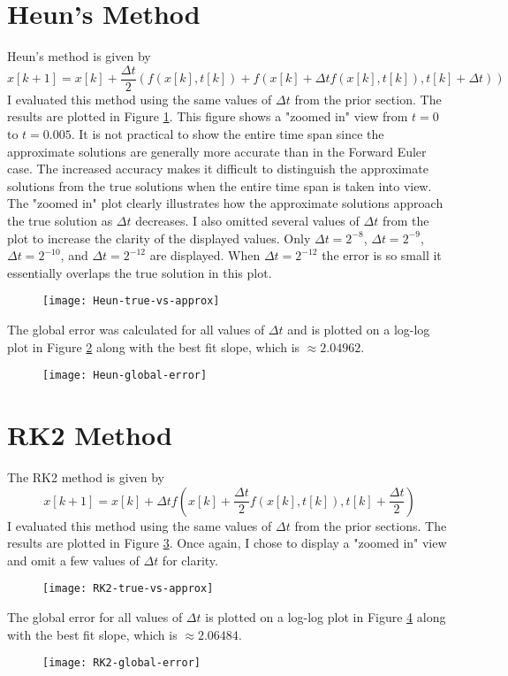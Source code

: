 \documentclass{article}
\begin{document}
\section{Heun's Method}
Heun's method is given by
\begin{equation} \label{eq:5}
    x[k+1] = x[k] + \frac{\Delta t}{2}(f(x[k], t[k]) + f(x[k] + {\Delta t}f(x[k], t[k]), t[k] + \Delta t))
\end{equation}
I evaluated this method using the same values of $\Delta t$ from the prior section.  The results are plotted in Figure \ref{fig:heun-approximations}.  This figure shows a "zoomed in" view from $t = 0$ to $t = 0.005$. It is not practical to show the entire time span since the approximate solutions are generally more accurate than in the Forward Euler case.  The increased accuracy makes it difficult to distinguish the approximate solutions from the true solutions when the entire time span is taken into view.  The "zoomed in" plot clearly illustrates how the approximate solutions approach the true solution as $\Delta t$ decreases.  I also omitted several values of $\Delta t$ from the plot to increase the clarity of the displayed values.  Only $\Delta t = 2^{-8}$, $\Delta t = 2^{-9}$, $\Delta t = 2^{-10}$, and $\Delta t = 2^{-12}$ are displayed.  When $\Delta t = 2^{-12}$ the error is so small it essentially overlaps the true solution in this plot.
\begin{figure}[H]
    \centering
    \texttt{[image: Heun-true-vs-approx]}
    \caption{}
    \label{fig:heun-approximations}
\end{figure}
The global error was calculated for all values of $\Delta t$ and is plotted on a log-log plot in Figure \ref{fig:heun-global-error} along with the best fit slope, which is $\approx 2.04962$.
\begin{figure}[H]
    \centering
    \texttt{[image: Heun-global-error]}
    \caption{}
    \label{fig:heun-global-error}
\end{figure}
\section{RK2 Method}
The RK2 method is given by
\begin{equation} \label{eq:6}
    x[k + 1] = x[k] + {\Delta t}f(x[k] + \frac{\Delta t}{2}f(x[k], t[k]), t[k] + \frac{\Delta t}{2})
\end{equation}
I evaluated this method using the same values of $\Delta t$ from the prior sections.  The results are plotted in Figure \ref{fig:rk2-approximations}.  Once again, I chose to display a "zoomed in" view and omit a few values of $\Delta t$ for clarity.
\begin{figure}[H]
    \centering
    \texttt{[image: RK2-true-vs-approx]}
    \caption{}
    \label{fig:rk2-approximations}
\end{figure}
The global error for all values of $\Delta t$ is plotted on a log-log plot in Figure \ref{fig:rk2-global-error} along with the best fit slope, which is $\approx 2.06484$.
\begin{figure}[H]
    \centering
    \texttt{[image: RK2-global-error]}
    \caption{}
    \label{fig:rk2-global-error}
\end{figure}
\end{document}
